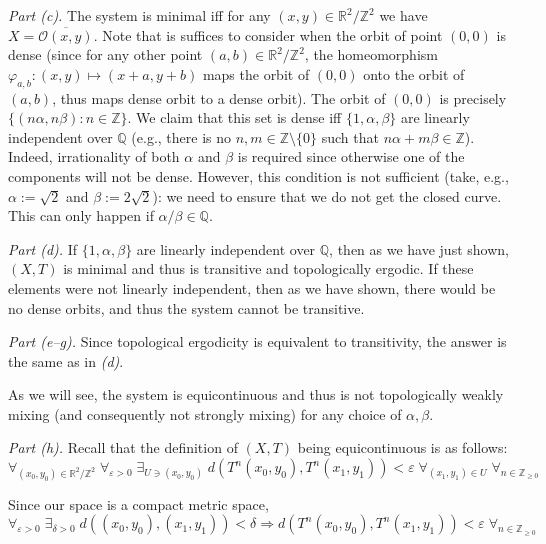 \documentclass{template}
\begin{document}
\textit{Part (c).} The system is minimal iff for any $(x,y) \in
\mathbb{R}^2/\mathbb{Z}^2$ we have $X=\overline{\mathcal{O}(x,y)}$. Note that is
suffices to consider when the orbit of point $(0,0)$ is dense (since for any
other point $(a,b) \in \mathbb{R}^2/\mathbb{Z}^2$, the homeomorphism
$\varphi_{a,b}: (x,y) \mapsto (x+a,y+b)$ maps the orbit of $(0,0)$ onto the
orbit of $(a,b)$, thus maps dense orbit to a dense orbit). The orbit of $(0,0)$
is precisely $\{(n\alpha,n\beta): n \in \mathbb{Z}\}$. We claim that this set is
dense iff \textcolor{green!50!black}{$\{1,\alpha,\beta\}$ are linearly
independent over $\mathbb{Q}$} (e.g., there is no $n,m \in \mathbb{Z}\setminus
\{0\}$ such that $n\alpha+m\beta \in \mathbb{Z}$). Indeed, irrationality of both
$\alpha$ and $\beta$ is required since otherwise one of the components will not
be dense. However, this condition is not sufficient (take, e.g., $\alpha :=
\sqrt{2}$ and $\beta := 2\sqrt{2}$): we need to ensure that we do not get the
closed curve. This can only happen if $\alpha/\beta \in \mathbb{Q}$.

\textit{Part (d).} If $\{1,\alpha,\beta\}$ are linearly independent over
$\mathbb{Q}$, then as we have just shown, $(X,T)$ is minimal and thus is
transitive and topologically ergodic. If these elements were not linearly
independent, then as we have shown, there would be no dense orbits, and thus the
system cannot be transitive. 

\textit{Part (e--g).} Since topological ergodicity is equivalent to
transitivity, the answer is the same as in \textit{(d)}. 

As we will see, the system is equicontinuous and thus is not topologically
weakly mixing (and consequently not strongly mixing) for any choice of
$\alpha,\beta$.

\textit{Part (h).} Recall that the definition of $(X,T)$ being equicontinuous
is as follows:
\begin{equation*}
    \forall_{(x_0,y_0) \in \mathbb{R}^2/\mathbb{Z}^2} \; \forall_{\varepsilon>0} 
    \; \exists_{U \ni (x_0,y_0)} \; d(T^n(x_0,y_0), T^n(x_1,y_1)) < \varepsilon \; \forall_{(x_1,y_1) \in U} \; \forall_{n \in \mathbb{Z}_{\geq 0}}
\end{equation*} 

Since our space is a compact metric space,
\begin{equation*}
    \forall_{\varepsilon > 0} \; \exists_{\delta > 0} \; d((x_0,y_0),(x_1,y_1))<\delta \Rightarrow d(T^n(x_0,y_0), T^n(x_1,y_1))<\varepsilon \; \forall_{n \in \mathbb{Z}_{\geq 0}}
\end{equation*}
\end{document}
